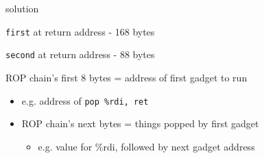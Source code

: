 \begin{frame}{solution}
\item \texttt{first} at return address - 168 bytes
\item \texttt{second} at return address - 88 bytes
\item ROP chain's first 8 bytes = address of first gadget to run
    \begin{itemize}
    \item e.g. address of \texttt{pop \%rdi, ret}
\item ROP chain's next bytes = things popped by first gadget
    \begin{itemize}
    \item e.g. value for \%rdi, followed by next gadget address
    \end{itemize}
\end{itemize}
\end{frame}
